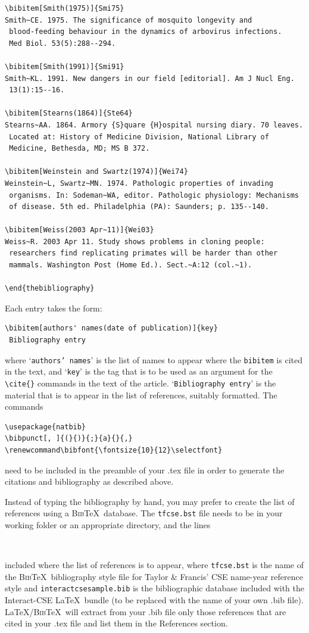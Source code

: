 \documentclass[]{interact}
\renewcommand\bibfont{\fontsize{10}{12}\selectfont}%
\theoremstyle{plain}%
\theoremstyle{definition}
\theoremstyle{remark}
\begin{document}
\begin{verbatim}
\bibitem[Smith(1975)]{Smi75}
Smith~CE. 1975. The significance of mosquito longevity and
 blood-feeding behaviour in the dynamics of arbovirus infections.
 Med Biol. 53(5):288--294.

\bibitem[Smith(1991)]{Smi91}
Smith~KL. 1991. New dangers in our field [editorial]. Am J Nucl Eng.
 13(1):15--16.

\bibitem[Stearns(1864)]{Ste64}
Stearns~AA. 1864. Armory {S}quare {H}ospital nursing diary. 70 leaves. 
 Located at: History of Medicine Division, National Library of 
 Medicine, Bethesda, MD; MS B 372.

\bibitem[Weinstein and Swartz(1974)]{Wei74}
Weinstein~L, Swartz~MN. 1974. Pathologic properties of invading 
 organisms. In: Sodeman~WA, editor. Pathologic physiology: Mechanisms 
 of disease. 5th ed. Philadelphia (PA): Saunders; p. 135--140.

\bibitem[Weiss(2003 Apr~11)]{Wei03}
Weiss~R. 2003 Apr 11. Study shows problems in cloning people:
 researchers find replicating primates will be harder than other
 mammals. Washington Post (Home Ed.). Sect.~A:12 (col.~1).

\end{thebibliography}
\end{verbatim}
\bigskip
\noindent Each entry takes the form:
\begin{verbatim}
\bibitem[authors' names(date of publication)]{key}
 Bibliography entry
\end{verbatim}
where `\texttt{authors' names}' is the list of names to appear where the \verb"bibitem" is cited in the text, and `\texttt{key}' is the tag that is to be used as an argument for the \verb"\cite{}" commands in the text of the article. `\texttt{Bibliography entry}' is the material that is to appear in the list of references, suitably formatted. The commands
\begin{verbatim}
\usepackage{natbib}
\bibpunct[, ]{(}{)}{;}{a}{}{,}
\renewcommand\bibfont{\fontsize{10}{12}\selectfont}
\end{verbatim}
need to be included in the preamble of your .tex file in order to generate the citations and bibliography as described above.

Instead of typing the bibliography by hand, you may prefer to create the list of references using a \textsc{Bib}\TeX\ database. The \texttt{tfcse.bst} file needs to be in your working folder or an appropriate directory, and the lines
\begin{verbatim}


\end{verbatim}
included where the list of references is to appear, where \texttt{tfcse.bst} is the name of the \textsc{Bib}\TeX\ bibliography style file for Taylor \& Francis' CSE name-year reference style and \texttt{interactcsesample.bib} is the bibliographic database included with the \textsf{Interact}-CSE \LaTeX\ bundle (to be replaced with the name of your own .bib file). \LaTeX/\textsc{Bib}\TeX\ will extract from your .bib file only those references that are cited in your .tex file and list them in the References section.
\end{document}
